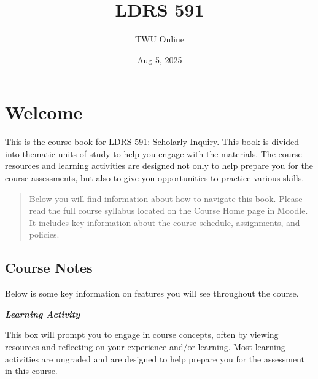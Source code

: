 \documentclass[
  letterpaper,
  DIV=11,
  numbers=noendperiod]{scrreprt}
\title{LDRS 591}
\author{TWU Online}
\date{Aug 5, 2025}
\renewcommand*\contentsname{Table of contents}
\newcommand\contentsname{Table of contents}
\begin{document}
\maketitle

\renewcommand*\contentsname{Table of contents}
{
\hypersetup{linkcolor=}
\setcounter{tocdepth}{2}
\tableofcontents
}


\chapter*{Welcome}\label{welcome}


This is the course book for LDRS 591: Scholarly Inquiry. This book is
divided into thematic units of study to help you engage with the
materials. The course resources and learning activities are designed not
only to help prepare you for the course assessments, but also to give
you opportunities to practice various skills.

\begin{quote}
Below you will find information about how to navigate this book. Please
read the full course syllabus located on the Course Home page in Moodle.
It includes key information about the course schedule, assignments, and
policies.
\end{quote}

\section*{Course Notes}\label{course-notes}


Below is some key information on features you will see throughout the
course.

\begin{tcolorbox}[enhanced jigsaw, breakable, colback=white, bottomrule=.15mm, leftrule=.75mm, colframe=quarto-callout-tip-color-frame, rightrule=.15mm, arc=.35mm, toprule=.15mm, left=2mm, opacityback=0]

\textbf{\emph{Learning Activity}}

This box will prompt you to engage in course concepts, often by viewing
resources and reflecting on your experience and/or learning. Most
learning activities are ungraded and are designed to help prepare you
for the assessment in this course.

\end{tcolorbox}
\end{document}
